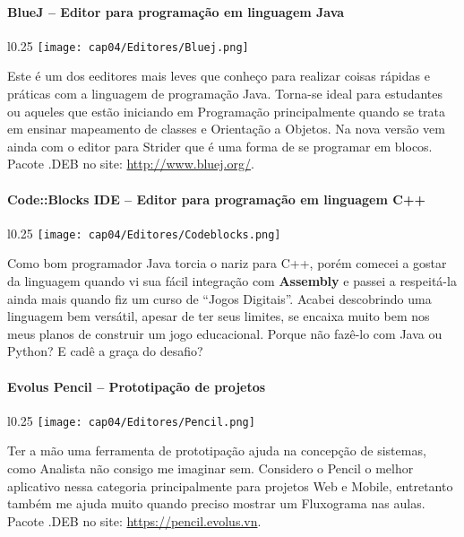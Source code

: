 \paragraph{BlueJ – Editor para programação em linguagem Java}
\begin{minipage}{\linewidth}
 \vspace{5pt}
 \begin{wrapfigure}{l}{0.25\textwidth}
  \vspace{-\baselineskip}
  \texttt{[image: cap04/Editores/Bluej.png]} 
 \end{wrapfigure}
 Este é um dos eeditores mais leves que conheço para realizar coisas rápidas e práticas com a linguagem de programação Java. Torna-se ideal para estudantes ou aqueles que estão iniciando em Programação principalmente quando se trata em ensinar mapeamento de classes e Orientação a Objetos. Na nova versão vem ainda com o editor para Strider que é uma forma de se programar em blocos. Pacote .DEB no site: \url{http://www.bluej.org/}.
\end{minipage}

\paragraph{Code::Blocks IDE – Editor para programação em linguagem C++}
\begin{minipage}{\linewidth}
 \vspace{5pt}
 \begin{wrapfigure}{l}{0.25\textwidth}
  \vspace{-\baselineskip}
  \texttt{[image: cap04/Editores/Codeblocks.png]} 
 \end{wrapfigure}
 Como bom programador Java torcia o nariz para C++, porém comecei a gostar da linguagem quando vi sua fácil integração com \textbf{Assembly} e passei a respeitá-la ainda mais quando fiz um curso de ``Jogos Digitais''. Acabei descobrindo uma linguagem bem versátil, apesar de ter seus limites, se encaixa muito bem nos meus planos de construir um jogo educacional. Porque não fazê-lo com Java ou Python? E cadê a graça do desafio?
\end{minipage}

\paragraph{Evolus Pencil – Prototipação de projetos}
\begin{minipage}{\linewidth}
 \vspace{5pt}
 \begin{wrapfigure}{l}{0.25\textwidth}
  \vspace{-\baselineskip}
  \texttt{[image: cap04/Editores/Pencil.png]} 
 \end{wrapfigure}
 Ter a mão uma ferramenta de prototipação ajuda na concepção de sistemas, como Analista não consigo me imaginar sem. Considero o Pencil o melhor aplicativo nessa categoria principalmente para projetos Web e Mobile, entretanto também me ajuda muito quando preciso mostrar um Fluxograma nas aulas. Pacote .DEB no site: \url{https://pencil.evolus.vn}.
\end{minipage}


